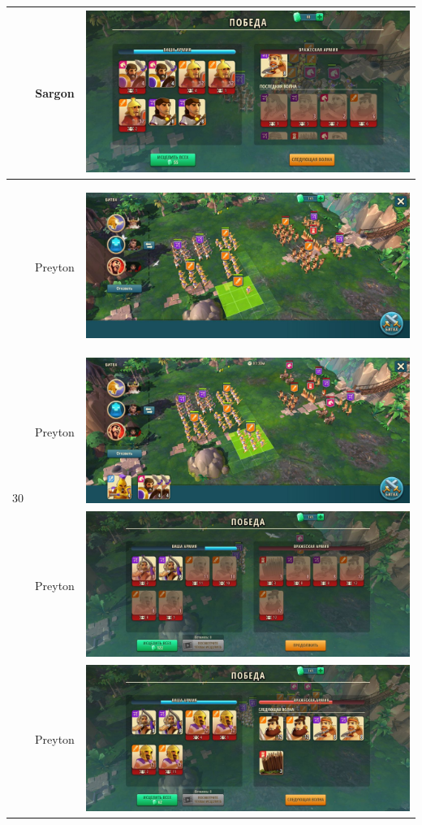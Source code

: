 \begin{longtable}{|c|c|c|}
	& Sargon &
	\includegraphics[width=0.75\linewidth]{./parts/media/TreasureHunt/30/sargon/photo_2022-04-07_10-05-00.jpg} \\
	\hline
	\multirow{15}{*}{30} & Preyton &
	\hypertarget{fight30}{\includegraphics[width=0.75\linewidth]{./parts/media/TreasureHunt/30/Preyton/30.2.jpg}} \\
	& Preyton &
	\includegraphics[width=0.75\linewidth]{./parts/media/TreasureHunt/30/Preyton/30.1.jpg} \\
	& Preyton &
	\includegraphics[width=0.75\linewidth]{./parts/media/TreasureHunt/30/Preyton/30_2.jpg} \\
	& Preyton &
	\includegraphics[width=0.75\linewidth]{./parts/media/TreasureHunt/30/Preyton/30_1.jpg} \\

\end{longtable}
